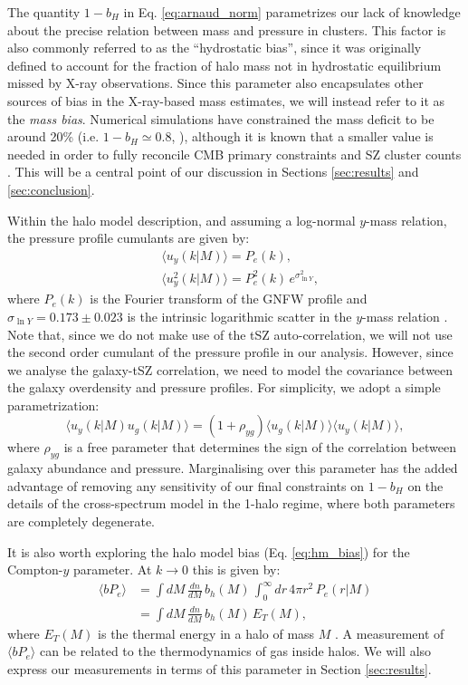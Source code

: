 \documentclass[useAMS,usenatbib]{mn2e}
\begin{document}
      The quantity $1-b_H$ in Eq. \ref{eq:arnaud_norm} parametrizes our lack of knowledge about the precise relation between mass and pressure in clusters. This factor is also commonly referred to as the ``hydrostatic bias'', since it was originally defined to account for the fraction of halo mass not in hydrostatic equilibrium missed by X-ray observations. Since this parameter also encapsulates other sources of bias in the X-ray-based mass estimates, we will instead refer to it as the \emph{mass bias}. Numerical simulations have constrained the mass deficit to be around 20\% (i.e. $1-b_H\simeq0.8$, \citep{2012ApJ...758...74B,2014ApJ...782..107N}), although it is known that a smaller value is needed in order to fully reconcile CMB primary constraints and SZ cluster counts \citep{2016A&A...594A..24P}. This will be a central point of our discussion in Sections \ref{sec:results} and \ref{sec:conclusion}.

      Within the halo model description, and assuming a log-normal $y$-mass relation, the pressure profile cumulants are given by:
      \begin{align}
        &\langle u_y(k|M)\rangle=P_e(k),\\
        &\langle u_y^2(k|M)\rangle=P_e^2(k)\,e^{\sigma_{\ln Y}^2},
      \end{align}
      where $P_e(k)$ is the Fourier transform of the GNFW profile and $\sigma_{\ln Y}=0.173\pm0.023$ is the intrinsic logarithmic scatter in the $y$-mass relation \cite{2016A&A...594A..24P}. Note that, since we do not make use of the tSZ auto-correlation, we will not use the second order cumulant of the pressure profile in our analysis. However, since we analyse the galaxy-tSZ correlation, we need to model the covariance between the galaxy overdensity and pressure profiles. For simplicity, we adopt a simple parametrization:
      \begin{equation}
        \langle u_y(k|M) u_g(k|M)\rangle = (1+\rho_{yg})\langle u_g(k|M)\rangle \langle u_y(k|M)\rangle,
      \end{equation}
      where $\rho_{yg}$ is a free parameter that determines the sign of the correlation between galaxy abundance and pressure. Marginalising over this parameter has the added advantage of removing any sensitivity of our final constraints on $1-b_H$ on the details of the cross-spectrum model in the 1-halo regime, where both parameters are completely degenerate.

      It is also worth exploring the halo model bias (Eq. \ref{eq:hm_bias}) for the Compton-$y$ parameter. At $k\rightarrow0$ this is given by:
      \begin{align}\nonumber
        \langle bP_e\rangle&=\int dM\,\frac{dn}{dM}\,b_h(M)\,\int_0^\infty dr\,4\pi r^2\,P_e(r|M)\\\label{eq:by}
               &=\int dM\,\frac{dn}{dM}\,b_h(M)\,E_T(M),
      \end{align}
      where $E_T(M)$ is the thermal energy in a halo of mass $M$ \citep{2017MNRAS.467.2315V,2019arXiv190413347P}. A measurement of $\langle bP_e\rangle$ can be related to the thermodynamics of gas inside halos. We will also express our measurements in terms of this parameter in Section \ref{sec:results}.
      
\end{document}
